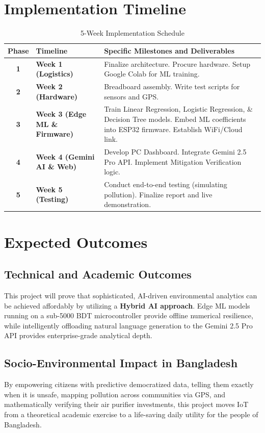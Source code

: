 \documentclass[12pt,a4paper]{report}
\begin{document}
\chapter{Implementation Timeline}
\begin{table}[H]
    \centering
    \begin{tabularx}{\textwidth}{|c|l|X|}
        \hline
        \textbf{Phase} & \textbf{Timeline} & \textbf{Specific Milestones and Deliverables} \\ \hline
        \textbf{1} & \textbf{Week 1 (Logistics)} & Finalize architecture. Procure hardware. Setup Google Colab for ML training. \\ \hline
        \textbf{2} & \textbf{Week 2 (Hardware)} & Breadboard assembly. Write test scripts for sensors and GPS. \\ \hline
        \textbf{3} & \textbf{Week 3 (Edge ML \& Firmware)} & Train Linear Regression, Logistic Regression, \& Decision Tree models. Embed ML coefficients into ESP32 firmware. Establish WiFi/Cloud link. \\ \hline
        \textbf{4} & \textbf{Week 4 (Gemini AI \& Web)} & Develop PC Dashboard. Integrate Gemini 2.5 Pro API. Implement Mitigation Verification logic. \\ \hline
        \textbf{5} & \textbf{Week 5 (Testing)} & Conduct end-to-end testing (simulating pollution). Finalize report and live demonstration. \\ \hline
    \end{tabularx}
    \caption{5-Week Implementation Schedule}
\end{table}

\chapter{Expected Outcomes}
\section{Technical and Academic Outcomes}
This project will prove that sophisticated, AI-driven environmental analytics can be achieved affordably by utilizing a \textbf{Hybrid AI approach}. Edge ML models running on a sub-5000 BDT microcontroller provide offline numerical resilience, while intelligently offloading natural language generation to the Gemini 2.5 Pro API provides enterprise-grade analytical depth. 

\section{Socio-Environmental Impact in Bangladesh}
By empowering citizens with predictive democratized data, telling them exactly when it is unsafe, mapping pollution across communities via GPS, and mathematically verifying their air purifier investments, this project moves IoT from a theoretical academic exercise to a life-saving daily utility for the people of Bangladesh.
\end{document}
